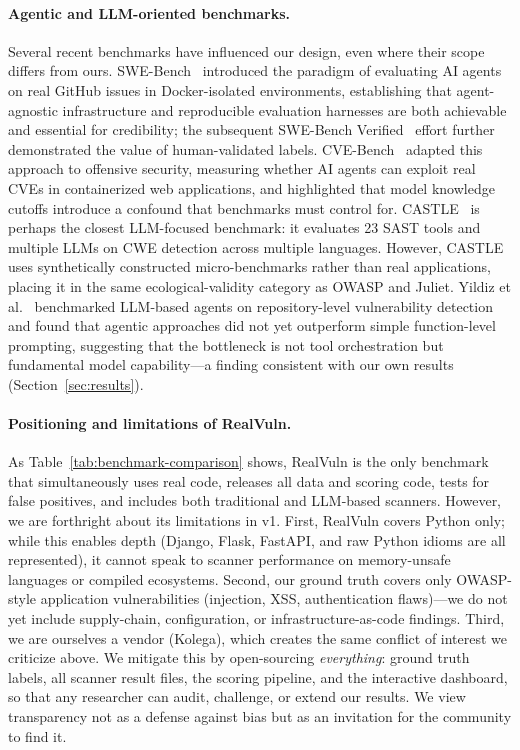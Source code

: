 \paragraph{Agentic and LLM-oriented benchmarks.}
Several recent benchmarks have influenced our design, even where their scope
differs from ours. SWE-Bench~\cite{jimenez2024swebench} introduced the
paradigm of evaluating AI agents on real GitHub issues in Docker-isolated
environments, establishing that agent-agnostic infrastructure and reproducible
evaluation harnesses are both achievable and essential for credibility;
the subsequent SWE-Bench Verified~\cite{openai2025swebenchverified} effort
further demonstrated the value of human-validated labels.
CVE-Bench~\cite{zhu2025cvebench} adapted this approach to offensive security,
measuring whether AI agents can exploit real CVEs in containerized web
applications, and highlighted that model knowledge cutoffs introduce a
confound that benchmarks must control for.
CASTLE~\cite{dubniczky2025castle} is perhaps the closest LLM-focused
benchmark: it evaluates 23 SAST tools and multiple LLMs on CWE detection
across multiple languages. However, CASTLE uses synthetically constructed
micro-benchmarks rather than real applications, placing it in the same
ecological-validity category as OWASP and Juliet.
Yildiz et al.~\cite{yildiz2025jitvul} benchmarked LLM-based agents on
repository-level vulnerability detection and found that agentic approaches did
not yet outperform simple function-level prompting, suggesting that the
bottleneck is not tool orchestration but fundamental model capability---a
finding consistent with our own results (Section~\ref{sec:results}).

\paragraph{Positioning and limitations of RealVuln.}
As Table~\ref{tab:benchmark-comparison} shows, RealVuln is the only benchmark
that simultaneously uses real code, releases all data and scoring code, tests
for false positives, and includes both traditional and LLM-based scanners.
However, we are forthright about its limitations in v1. First, RealVuln covers
Python only; while this enables depth (Django, Flask, FastAPI, and raw Python
idioms are all represented), it cannot speak to scanner performance on memory-unsafe
languages or compiled ecosystems. Second, our ground truth covers only
OWASP-style application vulnerabilities (injection, XSS, authentication
flaws)---we do not yet include supply-chain, configuration, or
infrastructure-as-code findings. Third, we are ourselves a vendor (Kolega),
which creates the same conflict of interest we criticize above. We mitigate
this by open-sourcing \emph{everything}: ground truth labels, all scanner
result files, the scoring pipeline, and the interactive dashboard, so that any
researcher can audit, challenge, or extend our results. We view transparency
not as a defense against bias but as an invitation for the community to find it.
